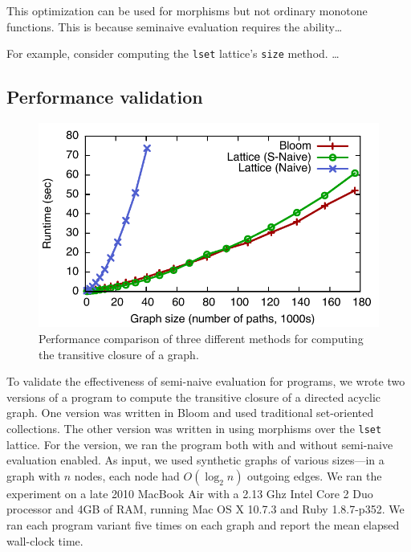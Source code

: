 This optimization can be used for morphisms but not ordinary monotone
functions. This is because seminaive evaluation requires the ability\ldots

For example, consider computing the \texttt{lset} lattice's \texttt{size}
method. \ldots


\subsection{Performance validation}
\label{sec:lattice-perf}
\begin{figure}[t]
\includegraphics[width=\linewidth]{fig/sn_perf}
\caption{Performance comparison of three different methods for computing the
  transitive closure of a graph.}
\label{fig:tc-perf-graph}
\end{figure}

To validate the effectiveness of semi-naive evaluation for \lang programs, we
wrote two versions of a program to compute the transitive closure of a directed
acyclic graph. One version was written in Bloom and used traditional
set-oriented collections. The other version was written in \lang using morphisms
over the \texttt{lset} lattice. For the \lang version, we ran the program both
with and without semi-naive evaluation enabled. As input, we used synthetic
graphs of various sizes---in a graph with $n$ nodes, each node had $O(\log_2 n)$
outgoing edges. We ran the experiment on a late 2010 MacBook Air with a 2.13 Ghz
Intel Core 2 Duo processor and 4GB of RAM, running Mac OS X 10.7.3 and Ruby
1.8.7-p352. We ran each program variant five times on each graph and report the
mean elapsed wall-clock time.

